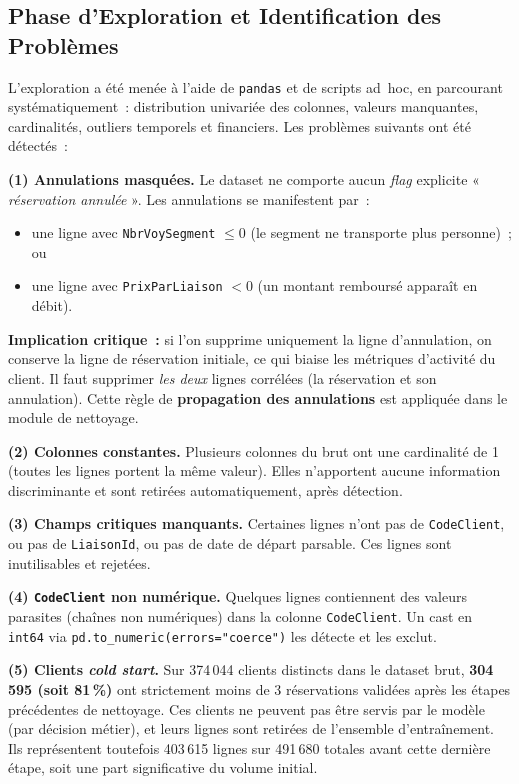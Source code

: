 \documentclass[11pt, a4paper]{article}
\begin{document}
\subsection{Phase d'Exploration et Identification des Problèmes}

L'exploration a été menée à l'aide de \texttt{pandas} et de scripts
ad~hoc, en parcourant systématiquement~: distribution univariée des
colonnes, valeurs manquantes, cardinalités, outliers temporels et
financiers. Les problèmes suivants ont été détectés~:

\textbf{(1) Annulations masquées.} Le dataset ne comporte aucun
\textit{flag} explicite « \textit{réservation annulée} ». Les annulations
se manifestent par~:
\begin{itemize}
\item une ligne avec \texttt{NbrVoySegment} $\leq 0$ (le segment ne
    transporte plus personne)~; ou
\item une ligne avec \texttt{PrixParLiaison} $< 0$ (un montant
    remboursé apparaît en débit).
\end{itemize}
\textbf{Implication critique~:} si l'on supprime uniquement la ligne
d'annulation, on conserve la ligne de réservation initiale, ce qui
biaise les métriques d'activité du client. Il faut supprimer
\textit{les deux} lignes corrélées (la réservation et son annulation).
Cette règle de \textbf{propagation des annulations} est appliquée dans
le module de nettoyage.

\textbf{(2) Colonnes constantes.} Plusieurs colonnes du brut ont une
cardinalité de 1 (toutes les lignes portent la même valeur). Elles
n'apportent aucune information discriminante et sont retirées
automatiquement, après détection.

\textbf{(3) Champs critiques manquants.} Certaines lignes
n'ont pas de \texttt{CodeClient}, ou pas de \texttt{LiaisonId}, ou pas
de date de départ parsable. Ces lignes sont inutilisables et rejetées.

\textbf{(4) \texttt{CodeClient} non numérique.} Quelques lignes
contiennent des valeurs parasites (chaînes non numériques) dans la
colonne \texttt{CodeClient}. Un cast en \texttt{int64} via
\texttt{pd.to\_numeric(errors="coerce")} les détecte et les exclut.

\textbf{(5) Clients \textit{cold start}.} Sur 374\,044 clients
distincts dans le dataset brut, \textbf{304\,595 (soit 81\,\%)} ont
strictement moins de 3 réservations validées après les étapes
précédentes de nettoyage. Ces clients ne peuvent pas être servis par
le modèle (par décision métier), et leurs lignes sont retirées de
l'ensemble d'entraînement. Ils représentent toutefois 403\,615 lignes
sur 491\,680 totales avant cette dernière étape, soit une part
significative du volume initial.
\end{document}
